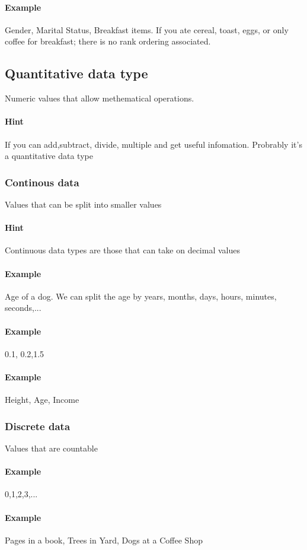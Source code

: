 \documentclass[]{article}
\begin{document}
\paragraph{Example} Gender, Marital Status, Breakfast items. If you ate cereal, toast, eggs, or only coffee for breakfast; there is no rank ordering associated.

\subsection{Quantitative data type}
Numeric values that allow methematical operations.
\paragraph{Hint} If you can add,subtract, divide, multiple and get useful infomation. Probrably it's a quantitative data type
\subsubsection{Continous data}
Values that can be split into smaller values
\paragraph{Hint} Continuous data types are those that can take on decimal values
\paragraph{Example} Age of a dog. We can split the age by years, months, days, hours, minutes, seconds,...
\paragraph{Example} 0.1, 0.2,1.5
\paragraph{Example} Height, Age, Income

\subsubsection{Discrete data}
Values that are countable
\paragraph{Example} 0,1,2,3,...
\paragraph{Example} Pages in a book, Trees in Yard, Dogs at a Coffee Shop
\end{document}
